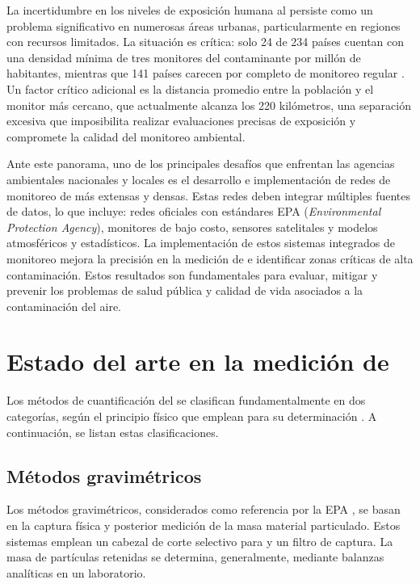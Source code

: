 La incertidumbre en los niveles de exposición humana al \MPF persiste como un problema significativo en numerosas áreas urbanas, particularmente en regiones con recursos limitados. La situación es crítica: solo 24 de 234 países cuentan con una densidad mínima de tres monitores del contaminante por millón de habitantes, mientras que 141 países carecen por completo de monitoreo regular \citep{Martin2019}. Un factor crítico adicional es la distancia promedio entre la población y el monitor más cercano, que actualmente alcanza los 220 kilómetros, una separación excesiva que imposibilita realizar evaluaciones precisas de exposición y compromete la calidad del monitoreo ambiental.

Ante este panorama, uno de los principales desafíos que enfrentan las agencias ambientales nacionales y locales es el desarrollo e implementación de redes de monitoreo de \MPF más extensas y densas. Estas redes deben integrar múltiples fuentes de datos, lo que incluye: redes oficiales con estándares EPA (\textit{Environmental Protection Agency}), monitores de bajo costo, sensores satelitales y modelos atmosféricos y estadísticos. La implementación de estos sistemas integrados de monitoreo mejora la precisión en la medición de \MPF e identificar zonas críticas de alta contaminación. Estos resultados son fundamentales para evaluar, mitigar y prevenir  los problemas de salud pública y calidad de vida asociados a la contaminación del aire.








\section{Estado del arte en la medición de \MPF}

Los métodos de cuantificación del \MPF se clasifican fundamentalmente en dos categorías, según el principio físico que emplean para su determinación \citep{Rojano2011}. A continuación, se listan estas clasificaciones.

\subsection{Métodos gravimétricos}
Los métodos gravimétricos, considerados como referencia por la EPA \citep{Noble2001}, se basan en la captura física y posterior medición de la masa material particulado. Estos sistemas emplean un cabezal de corte selectivo para \MPF y un filtro de captura. La masa de partículas retenidas se determina, generalmente, mediante balanzas analíticas en un laboratorio.

